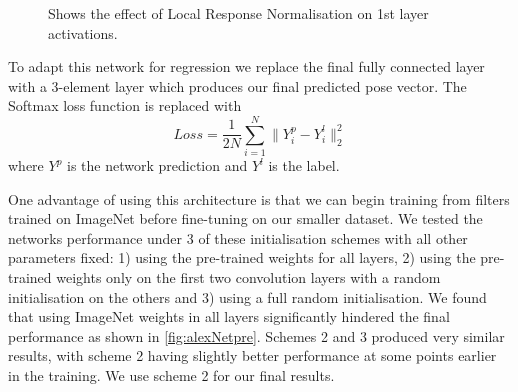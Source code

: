 \documentclass[11pt]{article} %
\begin{document}
\begin{figure}
\centering
{}%
\qquad
{}%
\caption{Shows the effect of Local Response Normalisation on 1st layer activations. }
\label{fig:LRN}
\end{figure}

To adapt this network for regression we replace the final fully connected layer with a 3-element layer which produces our final predicted pose vector. The Softmax loss function is replaced with
\begin{equation}
Loss = \frac{1}{2N} \sum_{i=1}^N \| Y^p_i - Y^l_i \|_2^2 
\label{eq:loss}
\end{equation}
where $Y^p$ is the network prediction and $Y^l$ is the label. 
 
One advantage of using this architecture is that we can begin training from filters trained on ImageNet before fine-tuning on our smaller dataset. We tested the networks performance under 3 of these initialisation schemes with all other parameters fixed: 1) using the pre-trained weights for all layers, 2) using the pre-trained weights only on the first two convolution layers with a random initialisation on the others and 3) using a full random initialisation. We found that using ImageNet weights in all layers significantly hindered the final performance as shown in \ref{fig:alexNetpre}. Schemes 2 and 3 produced very similar results, with scheme 2 having slightly better performance at some points earlier in the training. We use scheme 2 for our final results.
\end{document}

